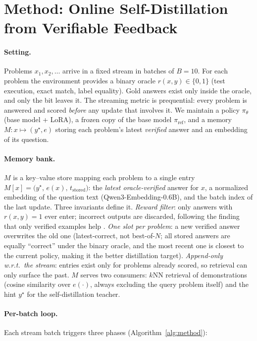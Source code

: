 \section{Method: Online Self-Distillation from Verifiable Feedback}
\label{sec:method}

\paragraph{Setting.} Problems $x_1, x_2, \dots$ arrive in a fixed stream in
batches of $B{=}10$. For each problem the environment provides a binary oracle
$r(x, y) \in \{0, 1\}$ (test execution, exact match, label equality). Gold answers exist only inside the oracle, and only the bit leaves it. The streaming metric
is prequential: every problem is answered and scored \emph{before} any update that
involves it. We maintain a policy $\pi_\theta$ (base model + LoRA), a frozen copy
of the base model $\pi_{\text{ref}}$, and a memory
$M : x \mapsto (y^\star, e)$ storing each problem's latest \emph{verified} answer
and an embedding of its question.

\paragraph{Memory bank.} $M$ is a key--value store mapping each problem to a
single entry
$M[x] = \big(y^\star,\, e(x),\, t_{\text{stored}}\big)$:
the \emph{latest oracle-verified} answer for $x$, a normalized embedding of the
question text (Qwen3-Embedding-0.6B), and the batch index of the last update.
Three invariants define it. \emph{Reward filter}: only answers with
$r(x, y){=}1$ ever enter; incorrect outputs are discarded, following the
finding that only verified examples help \citep{wu2024streambench}.
\emph{One slot per problem}: a new verified answer overwrites the old one
(latest-correct, not best-of-$N$; all stored answers are equally ``correct''
under the binary oracle, and the most recent one is closest to the current
policy, making it the better distillation target). \emph{Append-only w.r.t.\ the
stream}: entries exist only for problems already scored, so retrieval can only
surface the past. $M$ serves two consumers: $k$NN retrieval of
demonstrations (cosine similarity over $e(\cdot)$, always excluding the query
problem itself) and the hint $y^\star$ for the self-distillation teacher.

\paragraph{Per-batch loop.} Each stream batch triggers three phases
(Algorithm~\ref{alg:method}):

